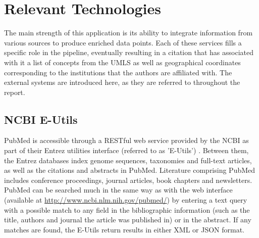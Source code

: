 \documentclass[Report.tex]{subfiles}
\begin{document}
\section{Relevant Technologies}
The main strength of this application is its ability to integrate information from various sources to produce enriched data points. Each of these services fills a specific role in the pipeline, eventually resulting in a citation that has associated with it a list of concepts from the UMLS as well as geographical coordinates corresponding to the institutions that the authors are affiliated with. The external systems are introduced here, as they are referred to throughout the report.

\subsection{NCBI E-Utils}
PubMed is accessible through a RESTful web service provided by the NCBI as part of their Entrez utilities interface (referred to as 'E-Utils') \cite{eutils}. Between them, the Entrez databases index genome sequences, taxonomies and full-text articles, as well as the citations and abstracts in PubMed. Literature comprising PubMed includes conference proceedings, journal articles, book chapters and newsletters. PubMed can be searched much in the same way as with the web interface (available at \url{http://www.ncbi.nlm.nih.gov/pubmed/}) by entering a text query with a possible match to any field in the bibliographic information (such as the title, authors and journal the article was published in) or in the abstract. If any matches are found, the E-Utils return results in either XML or JSON format. 
\end{document}
